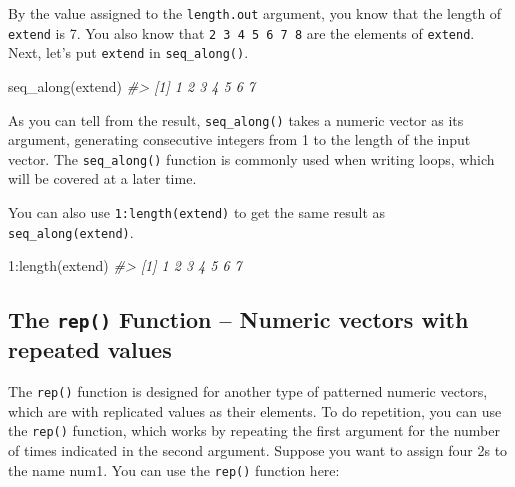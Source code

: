 \documentclass[
]{book}
\newenvironment{Shaded}{\begin{snugshade}}{\end{snugshade}}
\newcommand{\CommentTok}[1]{\textcolor[rgb]{0.56,0.35,0.01}{\textit{#1}}}
\newcommand{\DecValTok}[1]{\textcolor[rgb]{0.00,0.00,0.81}{#1}}
\newcommand{\FunctionTok}[1]{\textcolor[rgb]{0.00,0.00,0.00}{#1}}
\newcommand{\NormalTok}[1]{#1}
\newcommand{\SpecialCharTok}[1]{\textcolor[rgb]{0.00,0.00,0.00}{#1}}
\newenvironment{blackbox}{
  \definecolor{shadecolor}{rgb}{0, 0, 0}  %
  \color{white}
  \begin{shaded}}
 {\end{shaded}}
\newenvironment{infobox}[1]
  {
  \begin{itemize}
  \renewcommand{\labelitemi}{
    \raisebox{-.7\height}[0pt][0pt]{
      {\setkeys{Gin}{width=3em,keepaspectratio}
        \texttt{[image: pics/\#1]}}
    }
  }
  \setlength{\fboxsep}{1em}
  \begin{blackbox}
  \item
  }
  {
  \end{blackbox}
  \end{itemize}
  }
\begin{document}
By the value assigned to the \texttt{length.out} argument, you know that the length of \texttt{extend} is 7. You also know that \texttt{2\ 3\ 4\ 5\ 6\ 7\ 8} are the elements of \texttt{extend}. Next, let's put \texttt{extend} in \texttt{seq\_along()}.

\begin{Shaded}
\begin{Highlighting}[]
\FunctionTok{seq\_along}\NormalTok{(extend)}
\CommentTok{\#\textgreater{} [1] 1 2 3 4 5 6 7}
\end{Highlighting}
\end{Shaded}

As you can tell from the result, \texttt{seq\_along()} takes a numeric vector as its argument, generating consecutive integers from 1 to the length of the input vector. The \texttt{seq\_along()} function is commonly used when writing loops, which will be covered at a later time.

\begin{infobox}{caution}

You can also use \texttt{1:length(extend)} to get the same result as \texttt{seq\_along(extend)}.

\begin{Shaded}
\begin{Highlighting}[]
\DecValTok{1}\SpecialCharTok{:}\FunctionTok{length}\NormalTok{(extend)}
\CommentTok{\#\textgreater{} [1] 1 2 3 4 5 6 7}
\end{Highlighting}
\end{Shaded}

\end{infobox}

\hypertarget{the-rep-function-numeric-vectors-with-repeated-values}{%
\subsection{\texorpdfstring{The \texttt{rep()} Function -- Numeric vectors with repeated values}{The rep() Function -- Numeric vectors with repeated values}}\label{the-rep-function-numeric-vectors-with-repeated-values}}

The \texttt{rep()} function is designed for another type of patterned numeric vectors, which are with replicated values as their elements. To do repetition, you can use the \texttt{rep()} function, which works by repeating the first argument for the number of times indicated in the second argument. Suppose you want to assign four 2s to the name num1. You can use the \texttt{rep()} function here:
\end{document}
